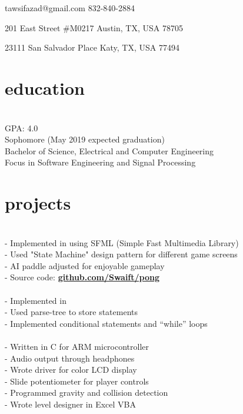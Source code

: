 \documentclass[12pt]{cv}
\begin{document}
\leftskip 8pc
\begin{flushright}

\vspace{0.5pc}
\contact
    {tawsifazad@gmail.com}
    {832-840-2884}

\address
    {Present}
    {201 East  Street \#M0217}
    {Austin, TX, USA}
    {78705}

\address
    {Permanent}
    {23111 San Salvador Place}
    {Katy, TX, USA}
    {77494}
\end{flushright}

\vspace{1pc}
\section{education}
 \hfill {} \\
GPA: 4.0 \\
Sophomore (May 2019 expected graduation) \\
Bachelor of Science, Electrical and Computer Engineering \\
Focus in Software Engineering and Signal Processing \\

\section{projects}
 \hfill {} \\
- Implemented in \CC using SFML (Simple Fast Multimedia Library) \\
- Used "State Machine" design pattern for different game screens \\
- AI paddle adjusted for enjoyable gameplay \\
- Source code: \underline{\textbf{github.com/Swaift/pong}} \\

 \hfill {} \\
- Implemented in \CC \\
- Used parse-tree to store statements \\
- Implemented conditional statements and ``while'' loops \\

 \hfill {} \\
- Written in C for ARM microcontroller \\
- Audio output through headphones \\
- Wrote driver for color LCD display \\
- Slide potentiometer for player controls \\
- Programmed gravity and collision detection \\
- Wrote level designer in Excel VBA \\
\end{document}
